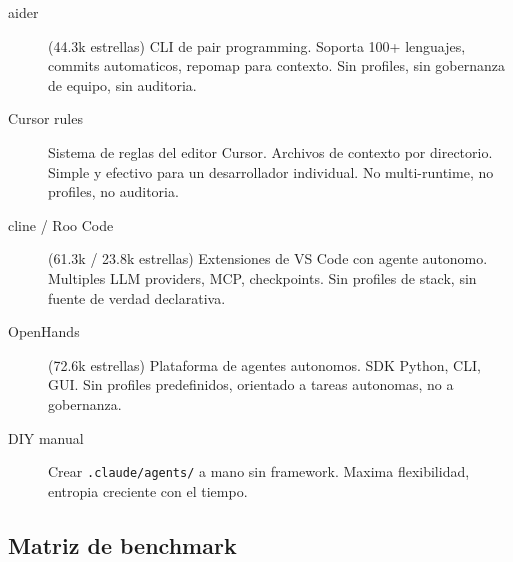 \documentclass[12pt,a4paper]{article}
\begin{document}
\begin{description}
  \item[aider] (44.3k estrellas) CLI de pair programming. Soporta 100+ lenguajes,
    commits automaticos, repomap para contexto. Sin profiles, sin gobernanza de equipo,
    sin auditoria.
  \item[Cursor rules] Sistema de reglas del editor Cursor. Archivos de contexto por
    directorio. Simple y efectivo para un desarrollador individual. No multi-runtime,
    no profiles, no auditoria.
  \item[cline / Roo Code] (61.3k / 23.8k estrellas) Extensiones de VS Code con agente
    autonomo. Multiples LLM providers, MCP, checkpoints. Sin profiles de stack, sin
    fuente de verdad declarativa.
  \item[OpenHands] (72.6k estrellas) Plataforma de agentes autonomos. SDK Python, CLI,
    GUI. Sin profiles predefinidos, orientado a tareas autonomas, no a gobernanza.
  \item[DIY manual] Crear \texttt{.claude/agents/} a mano sin framework. Maxima
    flexibilidad, entropia creciente con el tiempo.
\end{description}

\subsection{Matriz de benchmark}
\end{document}
